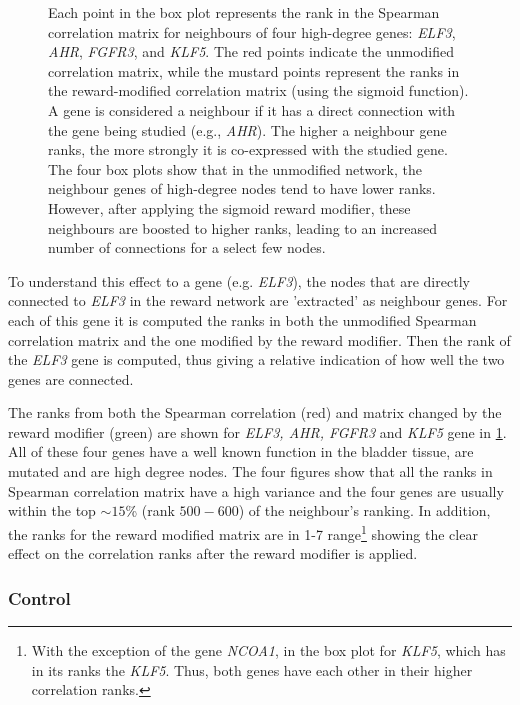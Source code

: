 \begin{figure}[!t]
    \caption[Spearman ranks of neighbour genes]{Each point in the box plot represents the rank in the Spearman correlation matrix for neighbours of four high-degree genes: \textit{ELF3}, \textit{AHR}, \textit{FGFR3}, and \textit{KLF5}. The red points indicate the unmodified correlation matrix, while the mustard points represent the ranks in the reward-modified correlation matrix (using the sigmoid function). A gene is considered a neighbour if it has a direct connection with the gene being studied (e.g., \textit{AHR}). The higher a neighbour gene ranks, the more strongly it is co-expressed with the studied gene. The four box plots show that in the unmodified network, the neighbour genes of high-degree nodes tend to have lower ranks. However, after applying the sigmoid reward modifier, these neighbours are boosted to higher ranks, leading to an increased number of connections for a select few nodes.}
    \label{fig:N_II:corr_analysis}
\end{figure}


To understand this effect to a gene (e.g. \textit{ELF3}), the nodes that are directly connected to \textit{ELF3} in the reward network are 'extracted' as neighbour genes. For each of this gene it is computed the ranks in both the unmodified Spearman correlation matrix and the one modified by the reward modifier. Then the rank of the \textit{ELF3} gene is computed, thus giving a relative indication of how well the two genes are connected.

The ranks from both the Spearman correlation (red) and matrix changed  by the reward modifier (green) are shown for \textit{ELF3, AHR, FGFR3} and \textit{KLF5} gene in \cref{fig:N_II:corr_analysis}. All of these four genes have a well known function in the bladder tissue, are mutated and are high degree nodes. The four figures show that all the ranks in Spearman correlation matrix have a high variance and the four genes are usually within the top $\sim15$\% (rank $500-600$) of the neighbour's ranking. In addition, the ranks for the reward modified matrix are in 1-7 range\footnote{With the exception of the gene \textit{NCOA1}, in the box plot for \textit{KLF5}, which has in its ranks the \textit{KLF5}. Thus, both genes have each other in their higher correlation ranks.} showing the clear effect on the correlation ranks after the reward modifier is applied. 

\subsubsection*{Control} \label{s:N_II:ctrl_exp}


